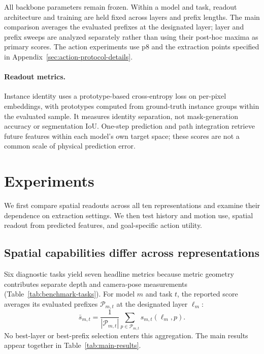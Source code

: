 \documentclass{article} %
\begin{document}
All backbone parameters remain frozen. Within a model and task, readout
architecture and training are held fixed across layers and prefix lengths.
The main comparison averages the evaluated prefixes at the designated layer;
layer and prefix sweeps are analyzed separately rather than using their
post-hoc maxima as primary scores. The action experiments use p8 and the
extraction points specified in Appendix~\ref{sec:action-protocol-details}.


\paragraph{Readout metrics.}
Instance identity uses a prototype-based cross-entropy loss on per-pixel
embeddings, with prototypes computed from ground-truth instance groups within
the evaluated sample. It measures identity separation, not
mask-generation accuracy or segmentation IoU. One-step prediction and path
integration retrieve future features within each model's own target space;
these scores are not a common scale of physical prediction error.

\section{Experiments}
\label{sec:experiments}
We first compare spatial readouts across all ten representations and
examine their dependence on extraction settings. We then test history and
motion use, spatial readout from predicted features, and goal-specific
action utility.

\subsection{Spatial capabilities differ across representations}
\label{sec:main-benchmark}
Six diagnostic tasks yield seven headline metrics because metric geometry
contributes separate depth and camera-pose measurements
(Table~\ref{tab:benchmark-tasks}). For model $m$ and task $t$, the reported
score averages its evaluated prefixes $\mathcal{P}_{m,t}$ at the designated
layer $\ell_m$:
\begin{equation}
  \bar{s}_{m,t}=\frac{1}{|\mathcal{P}_{m,t}|}
  \sum_{p\in\mathcal{P}_{m,t}}s_{m,t}(\ell_m,p).
  \label{eq:main-prefix-average}
\end{equation}
No best-layer or best-prefix selection enters this aggregation. The main results appear together in Table~\ref{tab:main-results}.
\end{document}
